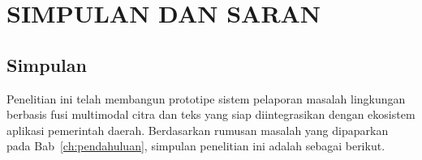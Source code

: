 \chapter{SIMPULAN DAN SARAN}
\label{ch:simpulan}

\section{Simpulan}
\label{sec:simpulan}

Penelitian ini telah membangun prototipe sistem pelaporan masalah lingkungan berbasis fusi multimodal citra dan teks yang siap diintegrasikan dengan ekosistem aplikasi pemerintah daerah. Berdasarkan rumusan masalah yang dipaparkan pada Bab~\ref{ch:pendahuluan}, simpulan penelitian ini adalah sebagai berikut.

